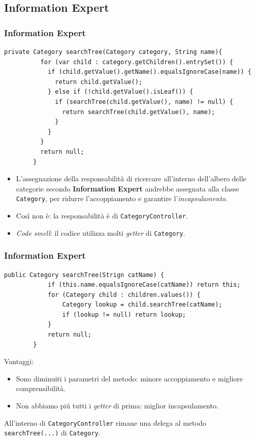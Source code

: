 \subsection{Information Expert}
    \begin{frame} [fragile]
      \frametitle{Information Expert}
        \begin{lstlisting}[autogobble, title={\texttt{CategoryController.java}}]
        private Category searchTree(Category category, String name){
          for (var child : category.getChildren().entrySet()) {
            if (child.getValue().getName().equalsIgnoreCase(name)) {
              return child.getValue();
            } else if (!child.getValue().isLeaf()) {
              if (searchTree(child.getValue(), name) != null) {
                return searchTree(child.getValue(), name);
              }
            }
          }
          return null;
        }
        \end{lstlisting}
      \begin{itemize}
        \item L'assegnazione della responsabilità di ricercare all'interno dell'albero delle categorie
        secondo \textbf{Information Expert} andrebbe assegnata alla classe \texttt{Category}, per ridurre
        l'accoppiamento e garantire l'\emph{incapsulamento}.
        \item Così non è: la responsabilità è di \texttt{CategoryController}.
        \item \emph{Code smell}: il codice utilizza molti \emph{getter} di \texttt{Category}.
      \end{itemize}
    \end{frame}

\begin{frame} [fragile]
    \frametitle{Information Expert}
    \begin{lstlisting}[autogobble, title={\texttt{Category.java}}]
        public Category searchTree(Strign catName) {
            if (this.name.equalsIgnoreCase(catName)) return this;
            for (Category child : children.values()) {
                Category lookup = child.searchTree(catName);
                if (lookup != null) return lookup;
            }
            return null;
        }
    \end{lstlisting}
    Vantaggi:
    \begin{itemize}
        \item Sono diminuiti i parametri del metodo: {\color{green}minore accoppiamento} e {\color{green}migliore comprensibilità}.
        \item Non abbiamo piú tutti i \emph{getter} di prima: {\color{green}miglior incapsulamento}.
    \end{itemize}
    All'interno di \texttt{CategoryController} rimane una delega al metodo \texttt{searchTree(...)} di \texttt{Category}.
\end{frame}
